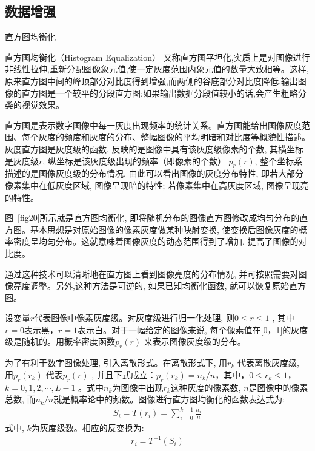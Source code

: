 \subsection{数据增强}

直方图均衡化

直方图均衡化（Histogram Equalization） 又称直方图平坦化,实质上是对图像进行非线性拉伸,重新分配图像象元值,使一定灰度范围内象元值的数量大致相等。这样,原来直方图中间的峰顶部分对比度得到增强,而两侧的谷底部分对比度降低,输出图像的直方图是一个较平的分段直方图:如果输出数据分段值较小的话,会产生粗略分类的视觉效果。

直方图是表示数字图像中每一灰度出现频率的统计关系。直方图能给出图像灰度范围、每个灰度的频度和灰度的分布、整幅图像的平均明暗和对比度等概貌性描述。灰度直方图是灰度级的函数, 反映的是图像中具有该灰度级像素的个数, 其横坐标是灰度级$r$, 纵坐标是该灰度级出现的频率（即像素的个数） $p_{r}(r)$, 整个坐标系描述的是图像灰度级的分布情况, 由此可以看出图像的灰度分布特性, 即若大部分像素集中在低灰度区域, 图像呈现暗的特性; 若像素集中在高灰度区域, 图像呈现亮的特性。

图~\ref{fig20}所示就是直方图均衡化, 即将随机分布的图像直方图修改成均匀分布的直方图。基本思想是对原始图像的像素灰度做某种映射变换, 使变换后图像灰度的概率密度呈均匀分布。这就意味着图像灰度的动态范围得到了增加, 提高了图像的对比度。

通过这种技术可以清晰地在直方图上看到图像亮度的分布情况, 并可按照需要对图像亮度调整。另外,这种方法是可逆的, 如果已知均衡化函数, 就可以恢复原始直方图。

设变量$r$代表图像中像素灰度级。对灰度级进行归一化处理, 则$0\leqslant r\leqslant 1$ , 其中$r=0$表示黑，$r=1$表示白。对于一幅给定的图像来说, 每个像素值在[0，1]的灰度级是随机的。用概率密度函数$p_{r}(r)$ 来表示图像灰度级的分布。

为了有利于数字图像处理, 引入离散形式。在离散形式下, 用$r_{k}$ 代表离散灰度级, 用$p_{r}(r_{k})$ 代表$p_{r}(r)$ , 并且下式成立：$p_{r}(r_{k})=n_{k}/n$，其中，$0\leqslant r_{k}\leqslant 1$，$k=0,1,2,\cdots ,L-1$ 。式中$n_{k}$为图像中出现$r_{k}$这种灰度的像素数, $n$是图像中的像素总数, 而$n_{k}/n$就是概率论中的频数。图像进行直方图均衡化的函数表达式为:
\begin{equation}
 \label{eq6}
 \begin{split}
   S_{i}=T(r_{i})=\sum_{i=0}^{k-1}\frac{n_{i}}{n}
 \end{split}
\end{equation}
式中, $k$为灰度级数。相应的反变换为:
\begin{equation}
 \label{eq7}
 \begin{split}
   r_{i}=T^{-1}(S_{i})
 \end{split}
\end{equation}

